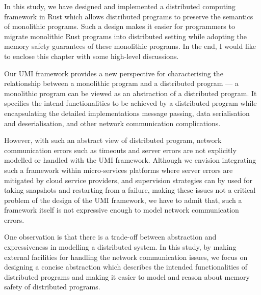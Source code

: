 \noindent
\begin{center}
\vspace{0.3em}
\vspace{-0.7em}
\end{center}
In this study, we have designed and implemented a distributed computing framework in Rust which allows distributed programs to preserve the semantics of monolithic programs. Such a design makes it easier for programmers to migrate monolithic Rust programs into distributed setting while adopting the memory safety guarantees of these monolithic programs. In the end, I would like to enclose this chapter with some high-level discussions.

Our UMI framework provides a new perspective for characterising the relationship between a monolithic program and a distributed program --- a monolithic program can be viewed as an abstraction of a distributed program. It specifies the intend functionalities to be achieved by a distributed program while encapsulating the detailed implementations message passing, data serialisation and deserialisation, and other network communication complications.

However, with such an abstract view of distributed program, network communication errors such as timeouts and server errors are not explicitly modelled or handled with the UMI framework. Although we envision integrating such a framework within micro-services platforms where server errors are mitigated by cloud service providers, and supervision strategies can by used for taking snapshots and restarting from a failure, making these issues not a critical problem of the design of the UMI framework, we have to admit that, such a framework itself is not expressive enough to model network communication errors.

One observation is that there is a trade-off between abstraction and expressiveness in modelling a distributed system. In this study, by making external facilities for handling the network communication issues, we focus on designing a concise abstraction which describes the intended functionalities of distributed programs and making it easier to model and reason about memory safety of distributed programs.

